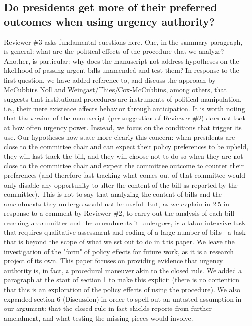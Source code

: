 \documentclass[article,letterpaper,times,12pt,listings-bw,microtype]{article}
\begin{document}
\subsection{Do presidents get more of their preferred outcomes when using urgency authority?}
Reviewer \#3 asks fundamental questions here. One, in the summary paragraph, is general: what are the political effects of the procedure that we analyze? Another, is particular: why does the manuscript not address hypotheses on the likelihood of passing urgent bills unamended and test them? In response to the first question, we have added reference to, and discuss the approach by McCubbins Noll and Weingast/Thies/Cox-McCubbins, among others, that suggests that institutional procedures are instruments of political manipulation, i.e., their mere existence affects behavior through anticipation. It is worth noting that ths version of the manuscript (per suggestion of Reviewer \#2) does not look at how often urgency power. Instead, we focus on the conditions that trigger its use. Our hypotheses now state more clearly this concern: when presidents are close to the committee chair and can expect their policy preferences to be upheld, they will fast track the bill, and they will choose not to do so when they are not close to the committee chair and expect the committee outcome to counter their preferences (and therefore fast tracking what comes out of that committee would only disable any opportunity to alter the content of the bill as reported by the committee). This is not to say that analyzing the content of bills and the amendments they undergo would not be useful. But, as we explain in 2.5 in response to a comment by Reviewer \#2, to carry out the analysis of each bill reaching a committee and the amendments it undergoes, is a labor intensive task that requires qualitative assessment and coding of a large number of bills --a task that is beyond the scope of what we set out to do in this paper. We leave the investigation of the "form" of policy effects for future work, as it is a research project of its own. This paper focuses on providing evidence that urgency authority is, in fact, a procedural maneuver akin to the closed rule. We added a paragraph at the start of section 1 to make this explicit (there is no contention that this is an exploration of the policy effects of using the procedure). We also expanded section 6 (Discussion) in order to spell out an untested assumption in our argument: that the closed rule in fact shields reports from further amendment, and what testing the missing pieces would involve.
\end{document}
